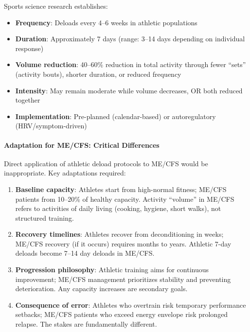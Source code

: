 Sports science research establishes:
\begin{itemize}
    \item \textbf{Frequency}: Deloads every 4--6 weeks in athletic populations~\cite{Bell2023deload}
    \item \textbf{Duration}: Approximately 7 days (range: 3--14 days depending on individual response)
    \item \textbf{Volume reduction}: 40--60\% reduction in total activity through fewer ``sets'' (activity bouts), shorter duration, or reduced frequency
    \item \textbf{Intensity}: May remain moderate while volume decreases, OR both reduced together
    \item \textbf{Implementation}: Pre-planned (calendar-based) or autoregulatory (HRV/symptom-driven)
\end{itemize}

\paragraph{Adaptation for ME/CFS: Critical Differences}

Direct application of athletic deload protocols to ME/CFS would be inappropriate. Key adaptations required:

\begin{enumerate}
    \item \textbf{Baseline capacity}: Athletes start from high-normal fitness; ME/CFS patients from 10--20\% of healthy capacity. Activity ``volume'' in ME/CFS refers to activities of daily living (cooking, hygiene, short walks), not structured training.

    \item \textbf{Recovery timelines}: Athletes recover from deconditioning in weeks; ME/CFS recovery (if it occurs) requires months to years. Athletic 7-day deloads become 7--14 day deloads in ME/CFS.

    \item \textbf{Progression philosophy}: Athletic training aims for continuous improvement; ME/CFS management prioritizes stability and preventing deterioration. Any capacity increases are secondary goals.

    \item \textbf{Consequence of error}: Athletes who overtrain risk temporary performance setbacks; ME/CFS patients who exceed energy envelope risk prolonged relapse. The stakes are fundamentally different.
\end{enumerate}

